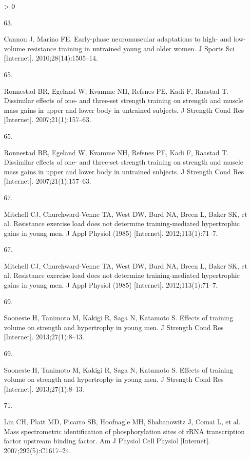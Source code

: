 \documentclass[twoside,10pt]{gihclass} %
\newlength{\cslhangindent}
\newlength{\csllabelwidth}
\newenvironment{CSLReferences}[3] %
 {%
  \setlength{\parindent}{0pt}
  \ifodd #1 \everypar{\setlength{\hangindent}{\cslhangindent}}\ignorespaces\fi
  \ifnum #2 > 0
  \setlength{\parskip}{#2\baselineskip}
  \fi
 }%
 {}
\newcommand{\CSLLeftMargin}[1]{\parbox[t]{\maxof{\widthof{#1}}{\csllabelwidth}}{#1}}
\newcommand{\CSLRightInline}[1]{\parbox[t]{\linewidth}{#1}}
\begin{document}
\begin{CSLReferences}{0}{0}
\leavevmode\hypertarget{ref-RN1382}{}%
\CSLLeftMargin{63. }
\CSLRightInline{Cannon J, Marino FE. Early-phase neuromuscular adaptations to high- and low-volume resistance training in untrained young and older women. J Sports Sci {[}Internet{]}. 2010;28(14):1505--14. }

\leavevmode\hypertarget{ref-RN776}{}%
\CSLLeftMargin{65. }
\CSLRightInline{Ronnestad BR, Egeland W, Kvamme NH, Refsnes PE, Kadi F, Raastad T. Dissimilar effects of one- and three-set strength training on strength and muscle mass gains in upper and lower body in untrained subjects. J Strength Cond Res {[}Internet{]}. 2007;21(1):157--63. }

\leavevmode\hypertarget{ref-RN776}{}%
\CSLLeftMargin{65. }
\CSLRightInline{Ronnestad BR, Egeland W, Kvamme NH, Refsnes PE, Kadi F, Raastad T. Dissimilar effects of one- and three-set strength training on strength and muscle mass gains in upper and lower body in untrained subjects. J Strength Cond Res {[}Internet{]}. 2007;21(1):157--63. }

\leavevmode\hypertarget{ref-RN834}{}%
\CSLLeftMargin{67. }
\CSLRightInline{Mitchell CJ, Churchward-Venne TA, West DW, Burd NA, Breen L, Baker SK, et al. Resistance exercise load does not determine training-mediated hypertrophic gains in young men. J Appl Physiol (1985) {[}Internet{]}. 2012;113(1):71--7. }

\leavevmode\hypertarget{ref-RN834}{}%
\CSLLeftMargin{67. }
\CSLRightInline{Mitchell CJ, Churchward-Venne TA, West DW, Burd NA, Breen L, Baker SK, et al. Resistance exercise load does not determine training-mediated hypertrophic gains in young men. J Appl Physiol (1985) {[}Internet{]}. 2012;113(1):71--7. }

\leavevmode\hypertarget{ref-RN1607}{}%
\CSLLeftMargin{69. }
\CSLRightInline{Sooneste H, Tanimoto M, Kakigi R, Saga N, Katamoto S. Effects of training volume on strength and hypertrophy in young men. J Strength Cond Res {[}Internet{]}. 2013;27(1):8--13. }

\leavevmode\hypertarget{ref-RN1607}{}%
\CSLLeftMargin{69. }
\CSLRightInline{Sooneste H, Tanimoto M, Kakigi R, Saga N, Katamoto S. Effects of training volume on strength and hypertrophy in young men. J Strength Cond Res {[}Internet{]}. 2013;27(1):8--13. }

\leavevmode\hypertarget{ref-RN2563}{}%
\CSLLeftMargin{71. }
\CSLRightInline{Lin CH, Platt MD, Ficarro SB, Hoofnagle MH, Shabanowitz J, Comai L, et al. Mass spectrometric identification of phosphorylation sites of rRNA transcription factor upstream binding factor. Am J Physiol Cell Physiol {[}Internet{]}. 2007;292(5):C1617--24. }


\end{CSLReferences}
\end{document}
